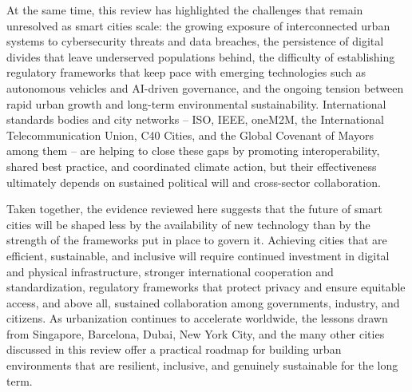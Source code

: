 \documentclass[journal]{IEEEtran}
\begin{document}
At the same time, this review has highlighted the challenges that remain unresolved as smart cities scale: the growing exposure of interconnected urban systems to cybersecurity threats and data breaches, the persistence of digital divides that leave underserved populations behind, the difficulty of establishing regulatory frameworks that keep pace with emerging technologies such as autonomous vehicles and AI-driven governance, and the ongoing tension between rapid urban growth and long-term environmental sustainability. International standards bodies and city networks -- ISO, IEEE, oneM2M, the International Telecommunication Union, C40 Cities, and the Global Covenant of Mayors among them -- are helping to close these gaps by promoting interoperability, shared best practice, and coordinated climate action, but their effectiveness ultimately depends on sustained political will and cross-sector collaboration.

Taken together, the evidence reviewed here suggests that the future of smart cities will be shaped less by the availability of new technology than by the strength of the frameworks put in place to govern it. Achieving cities that are efficient, sustainable, and inclusive will require continued investment in digital and physical infrastructure, stronger international cooperation and standardization, regulatory frameworks that protect privacy and ensure equitable access, and above all, sustained collaboration among governments, industry, and citizens. As urbanization continues to accelerate worldwide, the lessons drawn from Singapore, Barcelona, Dubai, New York City, and the many other cities discussed in this review offer a practical roadmap for building urban environments that are resilient, inclusive, and genuinely sustainable for the long term.
\end{document}
